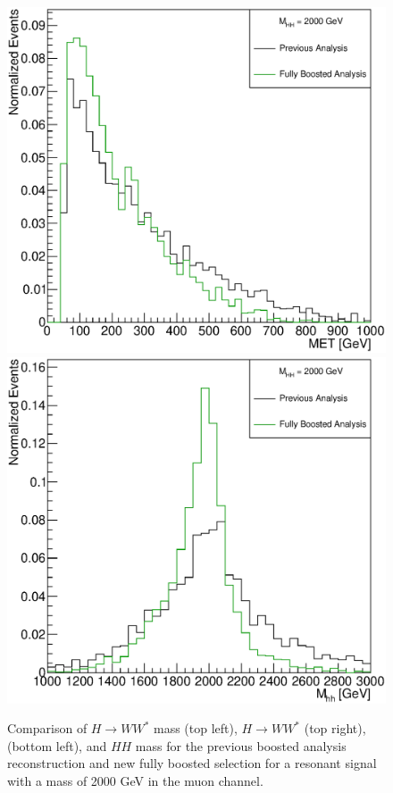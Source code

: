\begin{figure}[h]
\begin{center}
\includegraphics[scale=0.33]{figures/WHad_plots_john_withcuts/muon/wlep_met_Xhh2000}
\includegraphics[scale=0.33]{figures/WHad_plots_john_withcuts/muon/hh_m_Xhh2000}
\caption{Comparison of ${H\rightarrow WW^{*}}$ mass (top left), ${H\rightarrow WW^{*}}$ \pt (top right), \met (bottom left), and $HH$ mass for the  previous boosted analysis reconstruction and new fully boosted selection for a resonant signal with a mass of 2000 GeV in the muon channel.}
\label{fig:muon_sel}
\end{center}
\end{figure}





